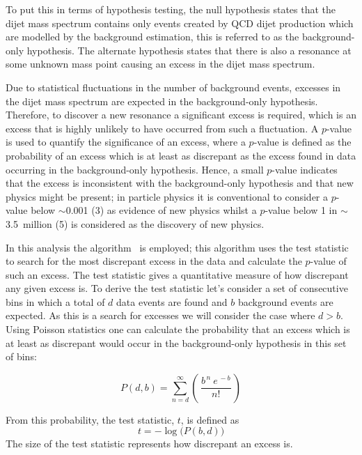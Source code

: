 To put this in terms of hypothesis testing,
the null hypothesis states that the dijet mass spectrum contains only events created by QCD dijet production
which are modelled by the background estimation,
this is referred to as the background-only hypothesis.
The alternate hypothesis states that there is also a resonance at some
unknown mass point causing an excess in the dijet mass spectrum.

Due to statistical fluctuations in the number of background events,
excesses in the dijet mass spectrum are expected in the background-only hypothesis.
Therefore, to discover a new resonance a significant excess is required,
which is an excess that is highly unlikely to have occurred from such a fluctuation.
A \mbox{$p$-value} is used to quantify the significance of an excess,
where a \mbox{$p$-value} is defined as the probability of an excess which is at least as discrepant as the excess found in data
occurring in the background-only hypothesis.
Hence, a small \mbox{$p$-value} indicates that the excess is inconsistent with the background-only hypothesis and that new physics might be present;
in particle physics it is conventional to consider a \mbox{$p$-value} below $\sim$0.001 (3\sigma) as evidence of new physics
whilst a \mbox{$p$-value} below 1 in $\sim$3.5~million (5\sigma) is considered as the discovery of new physics.

In this analysis the \bh{} algorithm~\cite{dibjet-bh} is employed;
this algorithm uses the \bh{} test statistic to 
search for the most discrepant excess in the data
and calculate the \mbox{$p$-value} of such an excess.
The \bh{} test statistic gives a quantitative measure of how discrepant any given excess is.
To derive the test statistic let's consider a set of consecutive bins in which
a total of $d$ data events are found and $b$ background events are expected.
As this is a search for excesses we will consider the case where $d > b$.
Using Poisson statistics one can calculate the probability that an excess which is at least as discrepant
would occur in the background-only hypothesis in this set of bins:

\begin{equation}
  P(d,b) = \sum_{n=d}^{\infty} \left(\,\frac{b^{\,n}~e^{\,-b}}{n!}\,\right)
\end{equation}

\vfill
\newpage

\noindent
From this probability, the \bh{} test statistic, $t$, is defined as
\begin{equation}
 t = -\log{\big(P(b,d)\big)}
\end{equation}
The size of the test statistic represents how discrepant an excess is.

